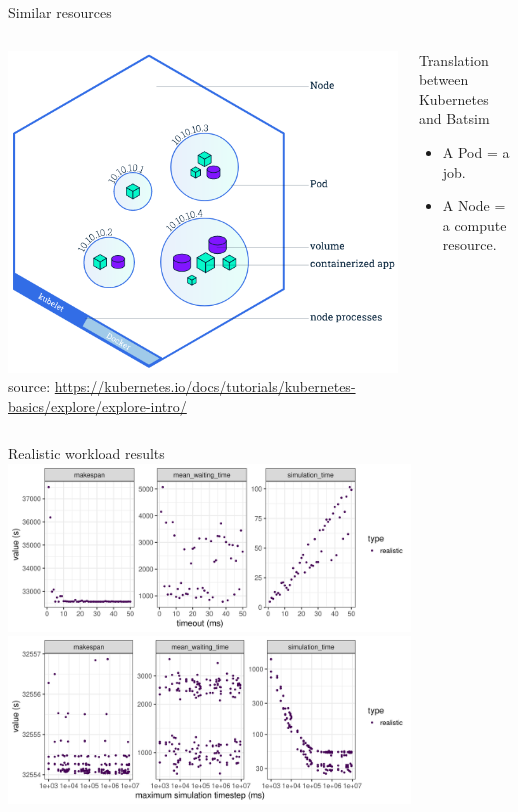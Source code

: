 \documentclass[12pt, aspectratio=43]{beamer}
\newcommand{\backupend}{
   \addtocounter{framenumberappendix}{-\value{framenumber}}
   \addtocounter{framenumber}{\value{framenumberappendix}} 
}
\begin{document}
\begin{frame}{Similar resources}
	\begin{columns}
		\centering
		\includegraphics[width=\textwidth]{../imgs/node-overview.png}
		\tiny{source: \url{https://kubernetes.io/docs/tutorials/kubernetes-basics/explore/explore-intro/}}

		\begin{block}{Translation between Kubernetes and Batsim}
			\begin{itemize}
				\item A Pod = a job.
				\item A Node = a compute resource.
			\end{itemize}
		\end{block}
	\end{columns}
\end{frame}

\begin{frame}{Realistic workload results}
	\centering
	\includegraphics[width=0.8\textwidth]{../imgs/timeout_realistic.png}
	\includegraphics[width=0.8\textwidth]{../imgs/max-timestep_realistic.png}
\end{frame}

\backupend
\end{document}
